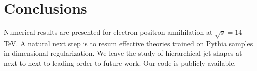 \section{Conclusions}\label{sec:conclusions}

Numerical results are presented for electron-positron annihilation at
$\sqrt{s} = 14$ TeV. A natural next step is to resum effective theories
trained on Pythia samples in dimensional regularization. We leave the
study of hierarchical jet shapes at next-to-next-to-leading order to
future work. Our code is publicly available.

